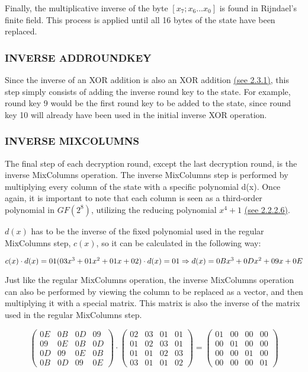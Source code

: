 \documentclass[12pt, a4paper]{report}
\theoremstyle{definition}
\theoremstyle{remark}
\begin{document}
Finally, the multiplicative inverse of the byte $[x_7;x_6...x_0]$ is found in Rijndael's finite field. This process is applied until all 16 bytes of the state have been replaced.

\subsubsection{INVERSE ADDROUNDKEY}
Since the inverse of an XOR addition is also an XOR addition \hyperref[InvXOR]{(see 2.3.1)}, this step simply consists of adding the inverse round key to the state. For example, round key 9 would be the first round key to be added to the state, since round key 10 will already have been used in the initial inverse XOR operation\cite{RoundKeyInverse}.

\subsubsection{INVERSE MIXCOLUMNS}
The final step of each decryption round, except the last decryption round, is the inverse MixColumns operation. The inverse MixColumns step is performed by multiplying every column of the state with a specific polynomial d(x)\cite{Rijndael}. Once again, it is important to note that each column is seen as a third-order polynomial in $GF(2^8)$, utilizing the reducing polynomial $x^4+1$ \hyperref[MixColumns]{(see 2.2.2.6)}.

$d(x)$ has to be the inverse of the fixed polynomial used in the regular MixColumns step, $c(x)$, so it can be calculated in the following way:

\noindent
$c(x) \cdot d(x)=01 \\
(03x^3+01x^2+01x+02) \cdot d(x)=01 \\
\Rightarrow d(x)=0Bx^3+0Dx^2+09x+0E$

Just like the regular MixColumns operation, the inverse MixColumns operation can also be performed by viewing the column to be replaced as a vector, and then multiplying it with a special matrix. This matrix is also the inverse of the matrix used in the regular MixColumns step.

\[ \left( \begin{array}{cccc}
0E & 0B & 0D & 09 \\
09 & 0E & 0B & 0D \\
0D & 09 & 0E & 0B \\
0B & 0D & 09 & 0E\end{array} \right)
\cdot
\left( \begin{array}{cccc}
02 & 03 & 01 & 01 \\
01 & 02 & 03 & 01 \\
01 & 01 & 02 & 03 \\
03 & 01 & 01 & 02\end{array} \right)
=
\left( \begin{array}{cccc}
01 & 00 & 00 & 00 \\
00 & 01 & 00 & 00 \\
00 & 00 & 01 & 00 \\
00 & 00 & 00 & 01\end{array} \right)
\]
\end{document}
